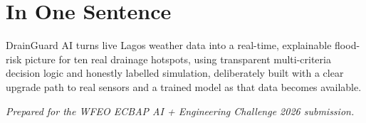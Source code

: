 \documentclass[11pt]{article}
\begin{document}
\section*{In One Sentence}
DrainGuard AI turns live Lagos weather data into a real-time, explainable flood-risk picture for ten real drainage hotspots, using transparent multi-criteria decision logic and honestly labelled simulation, deliberately built with a clear upgrade path to real sensors and a trained model as that data becomes available.

\vspace{1em}
\noindent\textit{Prepared for the WFEO ECBAP AI + Engineering Challenge 2026 submission.}
\end{document}

